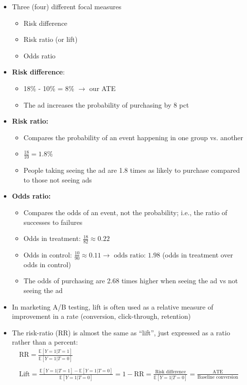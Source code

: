 \documentclass[10pt]{article}
\begin{document}
\begin{itemize}
    \item Three (four) different focal measures
    \begin{itemize}
        \item Risk difference 
        \item Risk ratio (or lift)
        \item Odds ratio
    \end{itemize}
    \item \textbf{Risk difference}:
    \begin{itemize}
        \item 18\% - 10\% = 8\% $\to $ our ATE
        \item The ad increases the probability of purchasing by 8 pct 
    \end{itemize}
    \item \textbf{Risk ratio:}
    \begin{itemize}
        \item Compares the probability of an event happening in one group vs. another
        \item $\frac{18}{10} = 1.8\% $
        \item People taking seeing the ad are 1.8 times as likely to purchase compared to those not seeing ads 
    \end{itemize}
    \item \textbf{Odds ratio:}
    \begin{itemize}
        \item Compares the odds of an event, not the probability; i.e., the ratio of successes to failures
        \item Odds in treatment: $\frac{18}{82}\approx 0.22 $
        \item Odds in control: $\frac{10}{90}\approx 0.11 \to \text{ odds ratio: }1.98$ (odds in treatment over odds in control)
        \item The odds of purchasing are 2.68 times higher when seeing the ad vs not seeing the ad 
    \end{itemize}
    \item In marketing A/B testing, lift is often used as a relative measure of improvement in a rate (conversion, click-through, retention)
    \item The risk-ratio (RR) is almost the same as ``lift'', just expressed as a ratio rather than a percent: 
    \begin{gather*}
        \text{RR} = \frac{\mathbb{E}[Y = 1 | T = 1]}{\mathbb{E}[Y = 1 | T = 0]}\\
        \\
        \text{Lift} = \frac{\mathbb{E}[Y = 1 | T = 1] - \mathbb{E}[Y = 1 | T = 0]}{\mathbb{E}[Y = 1 | T = 0]} = 1 - \text{RR} = \frac{\text{Risk difference}}{\mathbb{E}[Y = 1 | T = 0]} = \frac{\text{ATE}}{\text{Baseline conversion}}
    \end{gather*}
\end{itemize}
\end{document}
